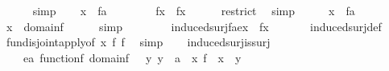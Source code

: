 \begin{isabellebody}
\ \ \ \ \isamarkupfalse%
\ simp\isanewline
\ \ \isamarkupfalse%
\ {\isachardoublequoteopen}x\ {\isasymin}\ f{\isacharminus}{\kern0pt}{\isacharbackquote}{\kern0pt}{\isacharbackquote}{\kern0pt}a{\isachardoublequoteclose}\isanewline
\ \ \isamarkupfalse%
\ \isanewline
\ \ \isamarkupfalse%
\ {\isachardoublequoteopen}{\isacharquery}{\kern0pt}f{}{\isacharbackquote}{\kern0pt}x\ {\isacharequal}{\kern0pt}\ f{\isacharbackquote}{\kern0pt}x{\isachardoublequoteclose}\isanewline
\ \ \ \ \isamarkupfalse%
\ restrict\ \isamarkupfalse%
\ simp\isanewline
\ \ \isamarkupfalse%
\ \isamarkupfalse%
\ {\isacartoucheopen}x\ {\isasymin}\ f{\isacharminus}{\kern0pt}{\isacharbackquote}{\kern0pt}{\isacharbackquote}{\kern0pt}a{\isacartoucheclose}\ \ {}\ \isanewline
\ \ \isamarkupfalse%
\ {\isachardoublequoteopen}x\ {\isasymnotin}\ domain{\isacharparenleft}{\kern0pt}{\isacharquery}{\kern0pt}f{}{\isacharparenright}{\kern0pt}{\isachardoublequoteclose}\isanewline
\ \ \ \ \isamarkupfalse%
\ simp\isanewline
\ \ \isamarkupfalse%
\ \isanewline
\ \ \isamarkupfalse%
\ {\isachardoublequoteopen}induced{\isacharunderscore}{\kern0pt}surj{\isacharparenleft}{\kern0pt}f{\isacharcomma}{\kern0pt}a{\isacharcomma}{\kern0pt}e{\isacharparenright}{\kern0pt}{\isacharbackquote}{\kern0pt}x\ {\isacharequal}{\kern0pt}\ f{\isacharbackquote}{\kern0pt}x{\isachardoublequoteclose}\ \isanewline
\ \ \ \ \isamarkupfalse%
\ induced{\isacharunderscore}{\kern0pt}surj{\isacharunderscore}{\kern0pt}def\ \isamarkupfalse%
\ fun{\isacharunderscore}{\kern0pt}disjoint{\isacharunderscore}{\kern0pt}apply{}{\isacharbrackleft}{\kern0pt}of\ x\ {\isacharquery}{\kern0pt}f{}\ {\isacharquery}{\kern0pt}f{}{\isacharbrackright}{\kern0pt}\ \isamarkupfalse%
\ simp\isanewline
{}\isamarkupfalse%
%
\endisatagproof
{\isafoldproof}%
%
\isadelimproof
\isanewline
%
\endisadelimproof
\ \ \isanewline
{}\isamarkupfalse%
\ induced{\isacharunderscore}{\kern0pt}surj{\isacharunderscore}{\kern0pt}is{\isacharunderscore}{\kern0pt}surj\ {\isacharcolon}{\kern0pt}\ \isanewline
\ \ \ \isanewline
\ \ \ \ {\isachardoublequoteopen}e{\isasymin}a{\isachardoublequoteclose}\ {\isachardoublequoteopen}function{\isacharparenleft}{\kern0pt}f{\isacharparenright}{\kern0pt}{\isachardoublequoteclose}\ {\isachardoublequoteopen}domain{\isacharparenleft}{\kern0pt}f{\isacharparenright}{\kern0pt}\ {\isacharequal}{\kern0pt}\ {\isasymalpha}{\isachardoublequoteclose}\ {\isachardoublequoteopen}{\isasymAnd}y{\isachardot}{\kern0pt}\ y\ {\isasymin}\ a\ {\isasymLongrightarrow}\ {\isasymexists}x{\isasymin}{\isasymalpha}{\isachardot}{\kern0pt}\ f\ {\isacharbackquote}{\kern0pt}\ x\ {\isacharequal}{\kern0pt}\ y{\isachardoublequoteclose}\ \isanewline

\end{isabellebody}
